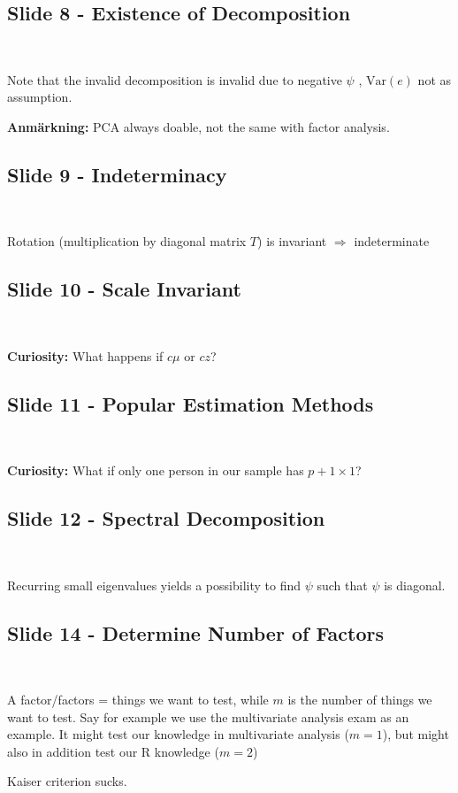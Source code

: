 \subsection{Slide 8 - Existence of Decomposition}\hfill\\
\par\bigskip
\noindent Note that the invalid decomposition is invalid due to negative $\psi$ , $\text{Var}\left(e\right)$ not as assumption.
\par\bigskip
\noindent\textbf{Anmärkning:} PCA always doable, not the same with factor analysis. 
\par\bigskip
\subsection{Slide 9 - Indeterminacy}\hfill\\\par
\noindent Rotation (multiplication by diagonal matrix $T$) is invariant $\Rightarrow$ indeterminate
\par\bigskip
\subsection{Slide 10 - Scale Invariant}\hfill\\\par
\noindent\textbf{Curiosity:} What happens if $c\mu$ or $cz$?
\par\bigskip
\subsection{Slide 11 - Popular Estimation Methods}\hfill\\\par
\noindent\textbf{Curiosity:} What if only one person in our sample has $p+1\times 1$?
\par\bigskip
\subsection{Slide 12 - Spectral Decomposition}\hfill\\\par
\noindent Recurring small eigenvalues yields a possibility to find $\psi$ such that $\psi$ is diagonal.
\par\bigskip
\subsection{Slide 14 - Determine Number of Factors}\hfill\\\par
\noindent A factor/factors = things we want to test, while $m$ is the number of things we want to test. Say for example we use the multivariate analysis exam as an example. It might test our knowledge in multivariate analysis ($m=1$), but might also in addition test our R knowledge ($m=2$) 
\par\bigskip
\noindent Kaiser criterion sucks.
\par\bigskip
